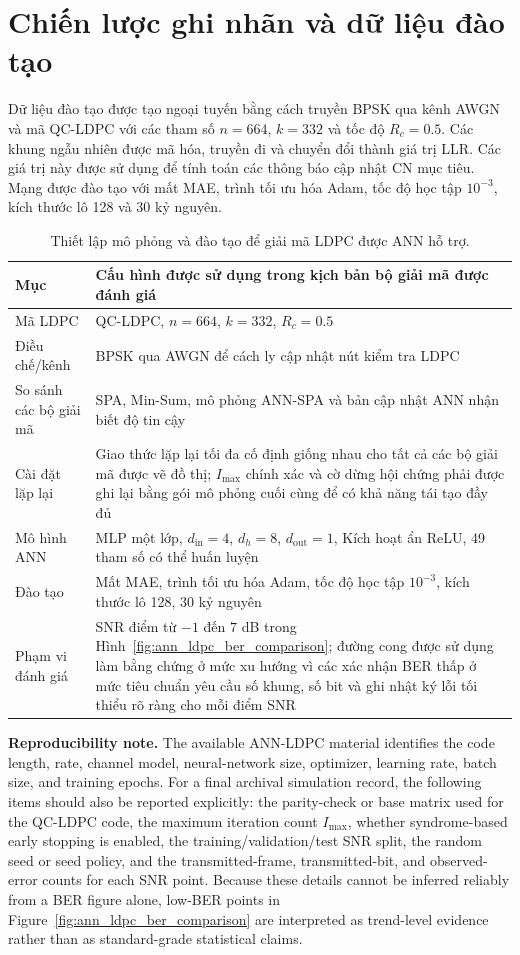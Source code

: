 \section{Chiến lược ghi nhãn và dữ liệu đào tạo}
Dữ liệu đào tạo được tạo ngoại tuyến bằng cách truyền BPSK qua kênh AWGN và mã QC-LDPC với các tham số $n=664$, $k=332$ và tốc độ $R_c=0.5$. Các khung ngẫu nhiên được mã hóa, truyền đi và chuyển đổi thành giá trị LLR. Các giá trị này được sử dụng để tính toán các thông báo cập nhật CN mục tiêu. Mạng được đào tạo với mất MAE, trình tối ưu hóa Adam, tốc độ học tập $10^{-3}$, kích thước lô 128 và 30 kỷ nguyên.

\begin{table}[H]
\centering
\caption{Thiết lập mô phỏng và đào tạo để giải mã LDPC được ANN hỗ trợ.}
\label{tab:ann_ldpc_config}
\begin{tabularx}{\textwidth}{p{}Y}
\toprule
Mục & Cấu hình được sử dụng trong kịch bản bộ giải mã được đánh giá\\
\midrule
Mã LDPC & QC-LDPC, $n=664$, $k=332$, $R_c=0.5$\\
Điều chế/kênh & BPSK qua AWGN để cách ly cập nhật nút kiểm tra LDPC\\
So sánh các bộ giải mã & SPA, Min-Sum, mô phỏng ANN-SPA và bản cập nhật ANN nhận biết độ tin cậy\\
Cài đặt lặp lại & Giao thức lặp lại tối đa cố định giống nhau cho tất cả các bộ giải mã được vẽ đồ thị; $I_{\max}$ chính xác và cờ dừng hội chứng phải được ghi lại bằng gói mô phỏng cuối cùng để có khả năng tái tạo đầy đủ\\
Mô hình ANN & MLP một lớp, $d_{\mathrm{in}}=4$, $d_h=8$, $d_{\mathrm{out}}=1$, Kích hoạt ẩn ReLU, 49 tham số có thể huấn luyện\\
Đào tạo & Mất MAE, trình tối ưu hóa Adam, tốc độ học tập $10^{-3}$, kích thước lô 128, 30 kỷ nguyên\\
Phạm vi đánh giá & SNR điểm từ $-1$ đến $7$ dB trong Hình~\ref{fig:ann_ldpc_ber_comparison}; đường cong được sử dụng làm bằng chứng ở mức xu hướng vì các xác nhận BER thấp ở mức tiêu chuẩn yêu cầu số khung, số bit và ghi nhật ký lỗi tối thiểu rõ ràng cho mỗi điểm SNR\\
\bottomrule
\end{tabularx}
\end{table}

\noindent\textbf{Reproducibility note.} The available ANN-LDPC material identifies the code length, rate, channel model, neural-network size, optimizer, learning rate, batch size, and training epochs. For a final archival simulation record, the following items should also be reported explicitly: the parity-check or base matrix used for the QC-LDPC code, the maximum iteration count $I_{\max}$, whether syndrome-based early stopping is enabled, the training/validation/test SNR split, the random seed or seed policy, and the transmitted-frame, transmitted-bit, and observed-error counts for each SNR point. Because these details cannot be inferred reliably from a BER figure alone, low-BER points in Figure~\ref{fig:ann_ldpc_ber_comparison} are interpreted as trend-level evidence rather than as standard-grade statistical claims.

